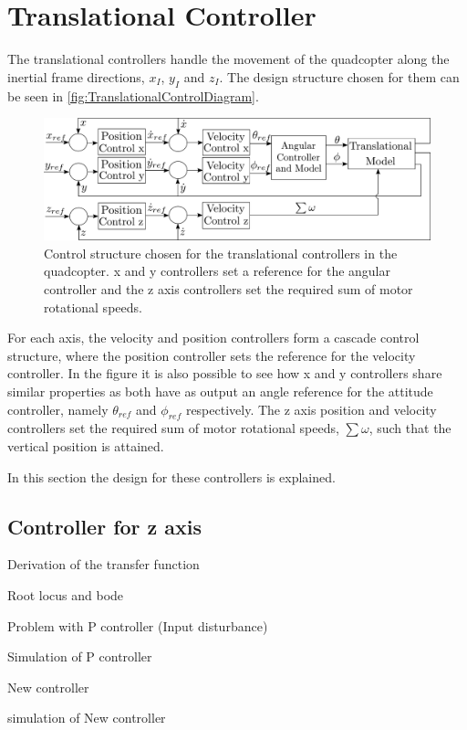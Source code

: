 \section{Translational Controller} \label{sec:TranslationalController}

The translational controllers handle the movement of the quadcopter along the inertial frame directions, $x_I$, $y_I$ and $z_I$. The design structure chosen for them can be seen in \autoref{fig:TranslationalControlDiagram}.
\begin{figure}[H]
	\centering
	\includegraphics[scale=0.3]{figures/TranslationalControlDiagram}
	\caption{Control structure chosen for the translational controllers in the quadcopter. x and y controllers set a reference for the angular controller and the z axis controllers set the required sum of motor rotational speeds.}
	\label{fig:TranslationalControlDiagram}
\end{figure}
For each axis, the velocity and position controllers form a cascade control structure, where the position controller sets the reference for the velocity controller. In the figure it is also possible to see how x and y controllers share similar properties as both have as output an angle reference for the attitude controller, namely $\theta_{ref}$ and $\phi_{ref}$ respectively. 
The z axis position and velocity controllers set the required sum of motor rotational speeds, $\sum\omega$, such that the vertical position is attained.

In this section the design for these controllers is explained.
\subsection{Controller for z axis}
Derivation of the transfer function 



Root locus and bode

Problem with P controller (Input disturbance)

Simulation of P controller

New controller 

simulation of New controller

